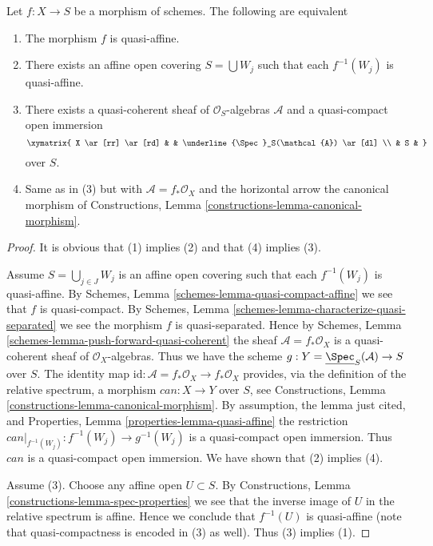 \begin{lemma}
\label{lemma-characterize-quasi-affine}
Let $f : X \to S$ be a morphism of schemes.
The following are equivalent
\begin{enumerate}
\item The morphism $f$ is quasi-affine.
\item There exists an affine open covering $S = \bigcup W_j$
such that each $f^{-1}(W_j)$ is quasi-affine.
\item There exists a quasi-coherent sheaf of $\mathcal{O}_S$-algebras
$\mathcal{A}$ and a quasi-compact open immersion
$$
\xymatrix{
X \ar[rr] \ar[rd] & & \underline{\Spec}_S(\mathcal{A}) \ar[dl] \\
& S &
}
$$
over $S$.
\item Same as in (3) but with $\mathcal{A} = f_*\mathcal{O}_X$
and the horizontal arrow the canonical morphism of
Constructions, Lemma \ref{constructions-lemma-canonical-morphism}.
\end{enumerate}
\end{lemma}

\begin{proof}
It is obvious that (1) implies (2) and that (4) implies (3).

\medskip\noindent
Assume $S = \bigcup_{j \in J} W_j$ is an affine open covering such that
each $f^{-1}(W_j)$ is quasi-affine. By
Schemes, Lemma \ref{schemes-lemma-quasi-compact-affine} we see
that $f$ is quasi-compact. By
Schemes, Lemma \ref{schemes-lemma-characterize-quasi-separated}
we see the morphism $f$ is quasi-separated. Hence by
Schemes, Lemma \ref{schemes-lemma-push-forward-quasi-coherent} the
sheaf $\mathcal{A} = f_*\mathcal{O}_X$ is a quasi-coherent sheaf
of $\mathcal{O}_X$-algebras. Thus we have the scheme
$g : Y = \underline{\Spec}_S(\mathcal{A}) \to S$ over $S$.
The identity map
$\text{id} : \mathcal{A} = f_*\mathcal{O}_X \to f_*\mathcal{O}_X$
provides, via the definition of the relative spectrum,
a morphism $can : X \to Y$ over $S$, see
Constructions, Lemma \ref{constructions-lemma-canonical-morphism}.
By assumption, the lemma just cited, and
Properties, Lemma \ref{properties-lemma-quasi-affine}
the restriction $can|_{f^{-1}(W_j)} : f^{-1}(W_j) \to g^{-1}(W_j)$
is a quasi-compact open immersion. Thus $can$ is a quasi-compact
open immersion. We have shown that (2) implies (4).

\medskip\noindent
Assume (3). Choose any affine open $U \subset S$.
By Constructions, Lemma \ref{constructions-lemma-spec-properties}
we see that the inverse image of $U$ in the relative spectrum
is affine. Hence we conclude that $f^{-1}(U)$ is quasi-affine
(note that quasi-compactness is encoded in (3) as well).
Thus (3) implies (1).
\end{proof}

